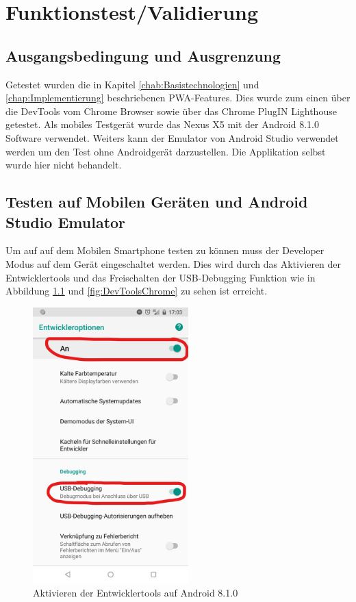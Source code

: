 \chapter{Funktionstest/Validierung}\label{chap:Funktionstest}
\thispagestyle{standard}
\pagestyle{standard}

\section{Ausgangsbedingung und Ausgrenzung}
Getestet wurden die in Kapitel \ref{chab:Basistechnologien} und \ref{chap:Implementierung} beschriebenen PWA-Features. Dies wurde zum einen über die DevTools vom Chrome Browser sowie über das Chrome PlugIN Lighthouse getestet. 
Als mobiles Testgerät wurde das Nexus X5 mit der Android 8.1.0 Software verwendet.  
Weiters kann der Emulator von Android Studio verwendet werden um den Test ohne Androidgerät darzustellen. Die Applikation selbst wurde hier nicht behandelt.
 
\section{Testen auf Mobilen Geräten und Android Studio Emulator}
Um auf auf dem Mobilen Smartphone testen zu können muss der Developer Modus auf dem Gerät eingeschaltet werden. Dies wird durch das Aktivieren der Entwicklertools und das Freischalten der USB-Debugging Funktion wie in Abbildung \ref{fig:DevToolsAndorid} und \ref{fig:DevToolsChrome} zu sehen ist erreicht. 

\begin{figure}[h]
	\centering
	\includegraphics[width=6cm]{BilderAllgemein/DevToolsAndroid}\medskip
	\caption{Aktivieren der Entwicklertools auf Android 8.1.0}
	\label{fig:DevToolsAndorid}
\end{figure}

